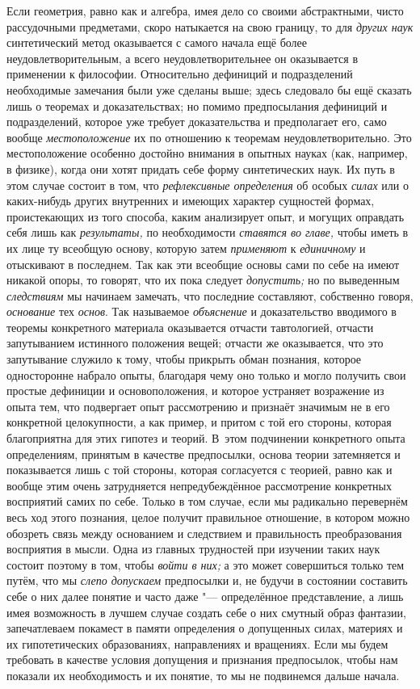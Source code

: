 Если геометрия, равно как и алгебра, имея дело со своими
абстрактными, чисто рассудочными предметами, скоро натыкается на свою
границу, то для {\em других наук}
синтетический метод оказывается с самого начала ещё более
неудовлетворительным, а всего неудовлетворительнее он оказывается в
применении к философии. Относительно дефиниций и подразделений необходимые
замечания были уже сделаны выше; здесь следовало бы ещё сказать лишь о
теоремах и доказательствах; но помимо предпосылания дефиниций и
подразделений, которое уже требует доказательства и предполагает его, само
вообще {\em местоположение}
их по отношению к теоремам неудовлетворительно. Это
местоположение особенно достойно внимания в опытных науках (как, например,
в физике), когда они хотят придать себе форму синтетических наук. Их путь в
этом случае состоит в том, что
{\em рефлексивные определения}
об особых {\em силах}
или о каких-нибудь других внутренних и имеющих характер
сущностей формах, проистекающих из того способа, каким анализирует опыт, и
могущих оправдать себя лишь как
{\em результаты,} по
необходимости {\em ставятся во главе,}
чтобы иметь в их лице ту всеобщую основу, которую затем
{\em применяют} к
{\em единичному} и
отыскивают в последнем. Так как эти всеобщие основы сами по себе на имеют
никакой опоры, то говорят, что их пока следует
{\em допустить;} но по
выведенным {\em следствиям}
мы начинаем замечать, что последние составляют,
собственно говоря,
{\em основание} тех
{\em основ}. Так
называемое {\em объяснение}
и доказательство вводимого в теоремы конкретного материала
оказывается отчасти тавтологией, отчасти запутыванием истинного положения
вещей; отчасти же оказывается, что это запутывание служило к тому, чтобы
прикрыть обман познания, которое односторонне набрало опыты, благодаря чему
оно только и могло получить свои простые дефиниции и основоположения, и
которое устраняет возражение из опыта тем, что подвергает опыт рассмотрению
и признаёт значимым не в его конкретной целокупности, а как пример, и
притом с той его стороны, которая благоприятна для этих гипотез и теорий.
В~этом подчинении конкретного опыта определениям, принятым в качестве
предпосылки, основа теории затемняется и показывается лишь с той стороны,
которая согласуется с теорией, равно как и вообще этим очень затрудняется
непредубеждённое рассмотрение конкретных восприятий самих по себе. Только в
том случае, если мы радикально перевернём весь ход этого познания, целое
получит правильное отношение, в котором можно обозреть связь между
основанием и следствием и правильность преобразования восприятия в мысли.
Одна из главных трудностей при изучении таких наук состоит поэтому в том,
чтобы {\em войти в них;}
а это может совершиться только тем путём, что мы
{\em слепо допускаем}
предпосылки и, не будучи в состоянии составить себе о них
далее понятие и часто даже "--- определённое представление, а
лишь имея возможность в лучшем случае создать себе о них смутный образ
фантазии, запечатлеваем покамест в памяти определения о допущенных силах,
материях и их гипотетических образованиях, направлениях и вращениях. Если
мы будем требовать в качестве условия допущения и признания предпосылок,
чтобы нам показали их необходимость и их понятие, то мы не подвинемся
дальше начала.

